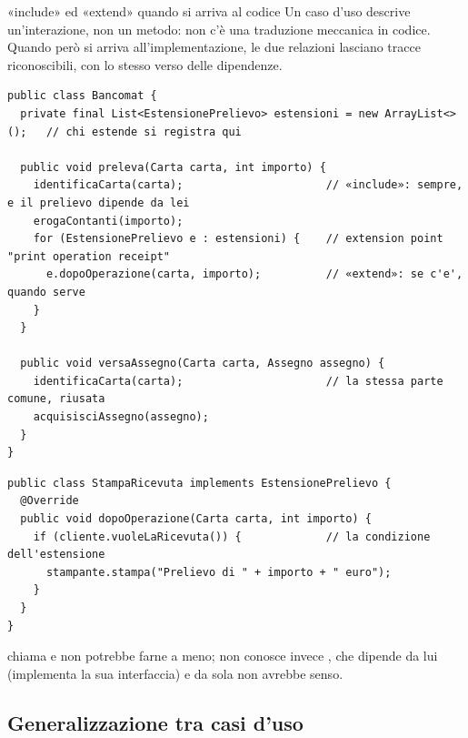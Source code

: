 \begin{esempio}{«include» ed «extend» quando si arriva al codice}
Un caso d'uso descrive un'interazione, non un metodo: non c'è una traduzione meccanica in codice. Quando però si arriva
all'implementazione, le due relazioni lasciano tracce riconoscibili, con lo stesso verso delle dipendenze.
\begin{lstlisting}[style=java, name=Bancomat.java]
public class Bancomat {
  private final List<EstensionePrelievo> estensioni = new ArrayList<>();   // chi estende si registra qui

  public void preleva(Carta carta, int importo) {
    identificaCarta(carta);                      // «include»: sempre, e il prelievo dipende da lei
    erogaContanti(importo);
    for (EstensionePrelievo e : estensioni) {    // extension point "print operation receipt"
      e.dopoOperazione(carta, importo);          // «extend»: se c'e', quando serve
    }
  }

  public void versaAssegno(Carta carta, Assegno assegno) {
    identificaCarta(carta);                      // la stessa parte comune, riusata
    acquisisciAssegno(assegno);
  }
}
\end{lstlisting}
\begin{lstlisting}[style=java, name=StampaRicevuta.java]
public class StampaRicevuta implements EstensionePrelievo {
  @Override
  public void dopoOperazione(Carta carta, int importo) {
    if (cliente.vuoleLaRicevuta()) {             // la condizione dell'estensione
      stampante.stampa("Prelievo di " + importo + " euro");
    }
  }
}
\end{lstlisting}
 chiama  e non potrebbe farne a meno; non conosce invece , che
dipende da lui (implementa la sua interfaccia) e da sola non avrebbe senso.
\end{esempio}

\subsection{Generalizzazione tra casi d'uso}


\begin{center}
\end{center}

